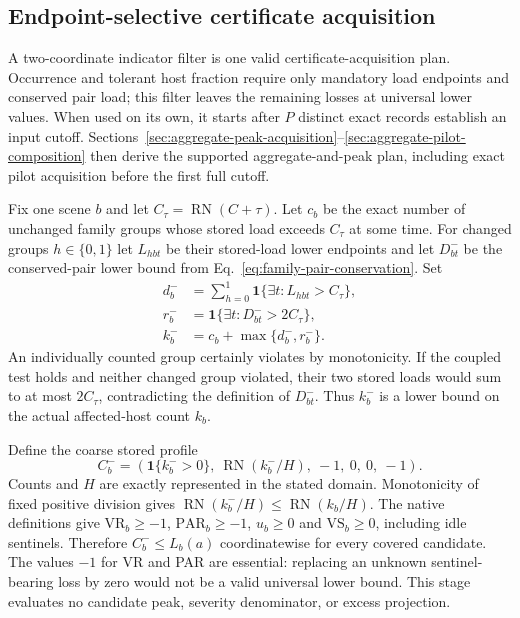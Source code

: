 \documentclass[11pt]{article}
\begin{document}
\subsection{Endpoint-selective certificate acquisition}\label{sec:endpoint-cascade}
A two-coordinate indicator filter is one valid certificate-acquisition plan. Occurrence and tolerant host fraction require only mandatory load endpoints and conserved pair load; this filter leaves the remaining losses at universal lower values. When used on its own, it starts after $P$ distinct exact records establish an input cutoff. Sections~\ref{sec:aggregate-peak-acquisition}--\ref{sec:aggregate-pilot-composition} then derive the supported aggregate-and-peak plan, including exact pilot acquisition before the first full cutoff.

Fix one scene $b$ and let $C_\tau=\operatorname{RN}(C+\tau)$. Let $c_b$ be the exact number of unchanged family groups whose stored load exceeds $C_\tau$ at some time. For changed groups $h\in\{0,1\}$ let $L_{hbt}$ be their stored-load lower endpoints and let $D^-_{bt}$ be the conserved-pair lower bound from Eq.~\eqref{eq:family-pair-conservation}. Set
\begin{align}
d_b^-&=\sum_{h=0}^1\mathbf1\{\exists t:L_{hbt}>C_\tau\},\nonumber\\
r_b^-&=\mathbf1\{\exists t:D^-_{bt}>2C_\tau\},\nonumber\\
k_b^-&=c_b+\max\{d_b^-,r_b^-\}.
\label{eq:indicator-cascade-count}
\end{align}
An individually counted group certainly violates by monotonicity. If the coupled test holds and neither changed group violated, their two stored loads would sum to at most $2C_\tau$, contradicting the definition of $D^-_{bt}$. Thus $k_b^-$ is a lower bound on the actual affected-host count $k_b$.

Define the coarse stored profile
\begin{equation}
C_b^-=\left(\mathbf1\{k_b^->0\},\ \operatorname{RN}(k_b^-/H),\ -1,\ 0,\ 0,\ -1\right).
\label{eq:indicator-cascade-profile}
\end{equation}
Counts and $H$ are exactly represented in the stated domain. Monotonicity of fixed positive division gives $\operatorname{RN}(k_b^-/H)\le\operatorname{RN}(k_b/H)$. The native definitions give $\mathrm{VR}_b\ge-1$, $\mathrm{PAR}_b\ge-1$, $u_b\ge0$ and $\mathrm{VS}_b\ge0$, including idle sentinels. Therefore $C_b^-\le L_b(a)$ coordinatewise for every covered candidate. The values $-1$ for VR and PAR are essential: replacing an unknown sentinel-bearing loss by zero would not be a valid universal lower bound. This stage evaluates no candidate peak, severity denominator, or excess projection.
\end{document}
